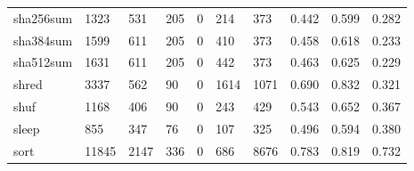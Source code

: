 \begin{longtable}{lp{1.3cm}p{1.3cm}p{1.3cm}p{1.3cm}p{1.3cm}p{1.3cm}p{1.3cm}p{1.3cm}p{1.3cm}}
sha256sum &                   1323 &                                531 &                               205 &                                0 &                               214 &                             373 &                                   0.442 &                                  0.599 &                                0.282 \\
sha384sum &                   1599 &                                611 &                               205 &                                0 &                               410 &                             373 &                                   0.458 &                                  0.618 &                                0.233 \\
sha512sum &                   1631 &                                611 &                               205 &                                0 &                               442 &                             373 &                                   0.463 &                                  0.625 &                                0.229 \\
shred     &                   3337 &                                562 &                                90 &                                0 &                              1614 &                            1071 &                                   0.690 &                                  0.832 &                                0.321 \\
shuf      &                   1168 &                                406 &                                90 &                                0 &                               243 &                             429 &                                   0.543 &                                  0.652 &                                0.367 \\
sleep     &                    855 &                                347 &                                76 &                                0 &                               107 &                             325 &                                   0.496 &                                  0.594 &                                0.380 \\
sort      &                  11845 &                               2147 &                               336 &                                0 &                               686 &                            8676 &                                   0.783 &                                  0.819 &                                0.732 \\

\end{longtable}
